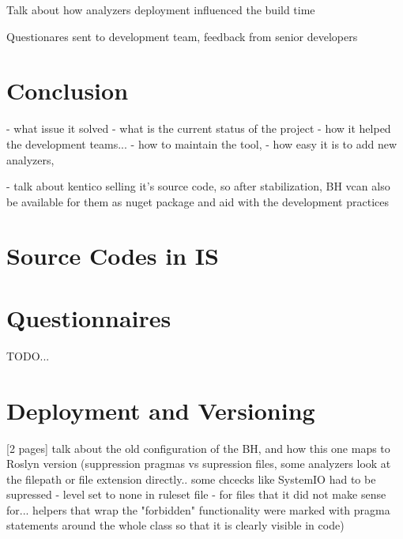 \documentclass[
  digital, %
  table,   %
  lof,     %
  lot,     %
  oneside,
]{fithesis3}
\begin{document}
Talk about how analyzers deployment influenced the build time

Questionares sent to development team, feedback from senior developers

\chapter{Conclusion}
  - what issue it solved
  - what is the current status of the project
  - how it helped the development teams...
  - how to maintain the tool, 
  - how easy it is to add new analyzers, 

- talk about kentico selling it's source code, so after stabilization, BH vcan also be available for them as nuget package and aid with the development practices 

	\makeatletter\thesis@blocks@clear\makeatother

	\printindex
    
  \printbibliography

	\appendix %
  \chapter{Source Codes in IS}
  \chapter{Questionnaires}
TODO...

  \chapter{Deployment and Versioning}
[2 pages]
talk about the old configuration of the BH, and how this one maps to Roslyn version (suppression pragmas vs supression files, some analyzers look at the filepath or file extension directly.. some chcecks like SystemIO had to be supressed - level set to none in ruleset file - for files that it did not make sense for... helpers that wrap the "forbidden" functionality were marked with pragma statements around the whole class so that it is clearly visible in code)
\end{document}
